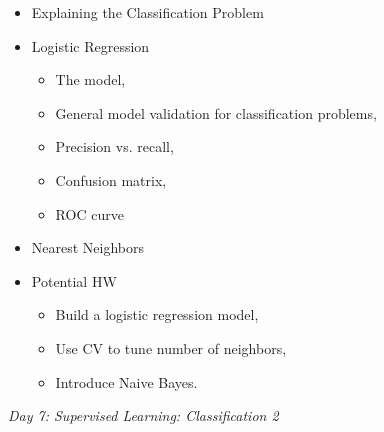 \documentclass[12pt]{article}
\begin{document}
	\noindent
	\begin{itemize}
		\item Explaining the Classification Problem
		\item Logistic Regression
			\begin{itemize}
				\item The model,
				\item General model validation for classification problems,
				\item Precision vs. recall,
				\item Confusion matrix,
				\item ROC curve
			\end{itemize}
		\item Nearest Neighbors
		\item Potential HW
			\begin{itemize}
				\item Build a logistic regression model,
				\item Use CV to tune number of neighbors,
				\item Introduce Naive Bayes.
			\end{itemize}
	\end{itemize}
	
	\vspace{2mm}
	\noindent
	\textit{\large{Day 7: Supervised Learning: Classification 2}}
	
\end{document}
